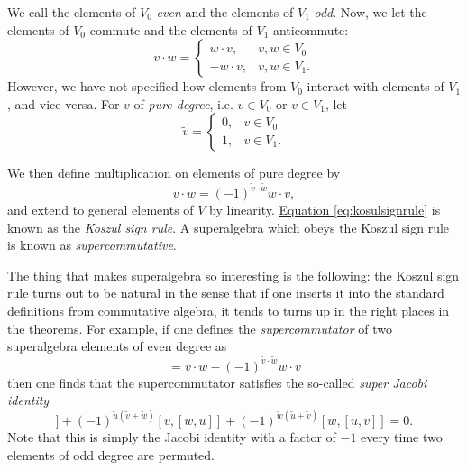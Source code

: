 \documentclass[a4paper,10pt]{scrreprt}
\theoremstyle{definition}
\theoremstyle{plain}
\theoremstyle{remark}
\begin{document}
We call the elements of $V_{0}$ \emph{even} and the elements of $V_{1}$ \emph{odd}. Now, we let the elements of $V_{0}$ commute and the elements of $V_{1}$ anticommute:
\begin{equation*}
  v\cdot w = 
  \begin{cases}
    w \cdot v, & v, w \in V_{0} \\
    -w\cdot v, & v, w \in V_{1}.
  \end{cases}
\end{equation*}
However, we have not specified how elements from $V_{0}$ interact with elements of $V_{1}$, and vice versa. For $v$ of \emph{pure degree}, i.e. $v \in V_{0}$ or $v \in V_{1}$, let
\begin{equation*}
  \tilde{v} = 
  \begin{cases}
    0, &v \in V_{0} \\
    1, &v \in V_{1}.
  \end{cases}
\end{equation*}

We then define multiplication on elements of pure degree by
\begin{equation}
  \label{eq:kosulsignrule}
  v\cdot w = (-1)^{\tilde{v}\cdot\tilde{w}} w\cdot v,
\end{equation}
and extend to general elements of $V$ by linearity. \hyperref[eq:kosulsignrule]{Equation \ref*{eq:kosulsignrule}} is known as the \emph{Koszul sign rule}. A superalgebra which obeys the Koszul sign rule is known as \emph{supercommutative}.

The thing that makes superalgebra so interesting is the following: the Koszul sign rule turns out to be natural in the sense that if one inserts it into the standard definitions from commutative algebra, it tends to turns up in the right places in the theorems. For example, if one defines the \emph{supercommutator} of two superalgebra elements of even degree as
\begin{equation*}
  [v, w] = v\cdot w - (-1)^{\tilde{v}\cdot\tilde{w}} w\cdot v
\end{equation*}
then one finds that the supercommutator satisfies the so-called \emph{super Jacobi identity}
\begin{equation*}
  [u,[v,w]] + (-1)^{\tilde{u}(\tilde{v} + \tilde{w})}[v,[w,u]] + (-1)^{\tilde{w}(\tilde{u}+\tilde{v})}[w,[u,v]] = 0.
\end{equation*}
Note that this is simply the Jacobi identity with a factor of $-1$ every time two elements of odd degree are permuted.
\end{document}
